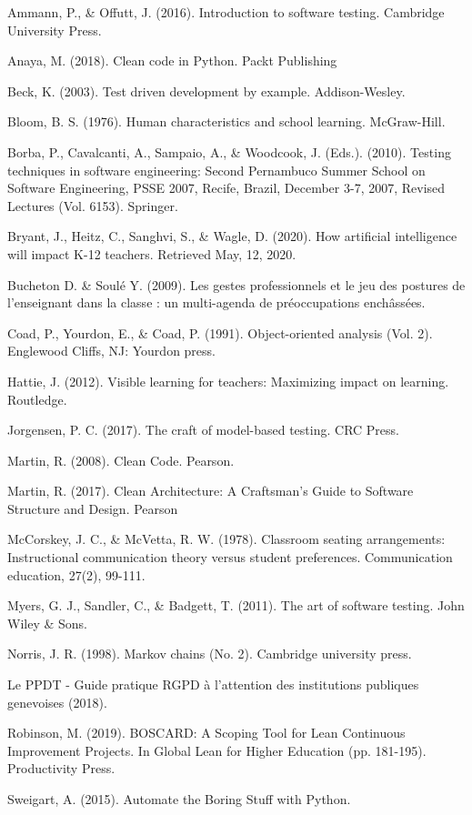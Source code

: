 \documentclass[10pt]{article}
\begin{document}
\begin{thebibliography}{Xyzz12}

 Ammann, P., \& Offutt, J. (2016). Introduction to software testing. Cambridge University Press.

 Anaya, M. (2018). Clean code in Python. Packt Publishing

 Beck, K. (2003). Test driven development by example. Addison-Wesley.

 Bloom, B. S. (1976). Human characteristics and school learning. McGraw-Hill.

 Borba, P., Cavalcanti, A., Sampaio, A., \& Woodcook, J. (Eds.). (2010). Testing techniques in software engineering: Second Pernambuco Summer School on Software Engineering, PSSE 2007, Recife, Brazil, December 3-7, 2007, Revised Lectures (Vol. 6153). Springer.

 Bryant, J., Heitz, C., Sanghvi, S., \& Wagle, D. (2020). How artificial intelligence will impact K-12 teachers. Retrieved May, 12, 2020.

 Bucheton D. \& Soulé Y. (2009). Les gestes professionnels et le jeu des postures de l’enseignant dans la classe : un multi-agenda de préoccupations enchâssées.

 Coad, P., Yourdon, E., \& Coad, P. (1991). Object-oriented analysis (Vol. 2). Englewood Cliffs, NJ: Yourdon press.

 Hattie, J. (2012). Visible learning for teachers: Maximizing impact on learning. Routledge.

 Jorgensen, P. C. (2017). The craft of model-based testing. CRC Press.

 Martin, R. (2008). Clean Code. Pearson.

 Martin, R. (2017). Clean Architecture: A Craftsman’s Guide to Software Structure and Design. Pearson

 McCorskey, J. C., \& McVetta, R. W. (1978). Classroom seating arrangements: Instructional communication theory versus student preferences. Communication education, 27(2), 99-111.

 Myers, G. J., Sandler, C., \& Badgett, T. (2011). The art of software testing. John Wiley \& Sons.

 Norris, J. R. (1998). Markov chains (No. 2). Cambridge university press.

 Le PPDT - Guide pratique RGPD à l'attention des institutions publiques genevoises (2018).


 Robinson, M. (2019). BOSCARD: A Scoping Tool for Lean Continuous Improvement Projects. In Global Lean for Higher Education (pp. 181-195). Productivity Press.

 Sweigart, A. (2015). Automate the Boring Stuff with Python.
\end{thebibliography}
\end{document}
